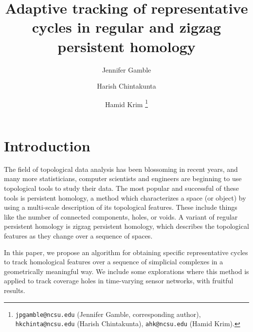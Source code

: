 \documentclass[12pt]{article}
\begin{document}
\title{Adaptive tracking of representative cycles in regular and zigzag persistent homology}
\author[*]{Jennifer Gamble}
\author[**]{Harish Chintakunta}
\author[*]{Hamid Krim
\thanks{\texttt{jpgamble@ncsu.edu} (Jennifer Gamble, corresponding author), \texttt{hkchinta@ncsu.edu} (Harish Chintakunta), \texttt{ahk@ncsu.edu} (Hamid Krim).}}
\date{}

\maketitle



\section{Introduction}

The field of topological data analysis \cite{Carlsson2009} has been blossoming in recent years, and many more statisticians, computer scientists and engineers are beginning to use topological tools to study their data. The most popular and successful of these tools is persistent homology, a method which characterizes a space (or object) by using a multi-scale description of its topological features. These include things like the number of connected components, holes, or voids. A variant of regular persistent homology is zigzag persistent homology, which describes the topological features as they change over a sequence of spaces.

In this paper, we propose an algorithm for obtaining specific representative cycles to track homological features over a sequence of simplicial complexes in a geometrically meaningful way. We include some explorations where this method is applied to track coverage holes in time-varying sensor networks, with fruitful results.
\end{document}

